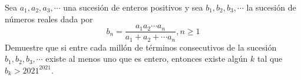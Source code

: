 Sea $a_1, a_2, a_3, \cdots$ una sucesión de enteros positivos y sea $b_1, b_2, b_3, \cdots$ la sucesión de números reales dada por
\[ b_n = \frac{a_1a_2 \cdots a_n}{a_1 + a_2 + \cdots a_n}, n \geq 1 \]
Demuestre que si entre cada millón de términos consecutivos de la sucesión $b_1, b_2, b_3, \cdots$ existe al menos uno que es entero, entonces existe algún $k$ tal que $b_k > 2021^2021$.
